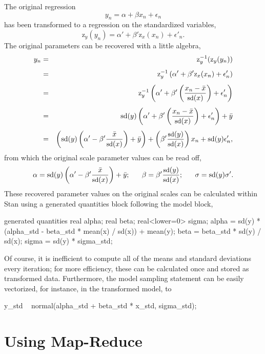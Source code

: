 The original regression
\[
y_n
= \alpha + \beta x_n + \epsilon_n
\]
has been transformed to a regression on the standardized variables,
\[
\mbox{z}_y(y_n)
= \alpha'
+ \beta' \mbox{z}_x(x_n)
+ \epsilon'_n.
\]
The original parameters can be recovered with a little algebra,
%
\begin{eqnarray*}
y_n
& = & \mbox{z}_y^{-1}(\mbox{z}_y(y_n))
\\[4pt]
& = &
\mbox{z}_y^{-1}
\left(
\alpha'
+ \beta' \mbox{z}_x(x_n)
+ \epsilon_n'
\right)
\\[4pt]
& = &
\mbox{z}_y^{-1}
\left(
\alpha'
+ \beta'
    \left(
      \frac{x_n - \bar{x}}{\mbox{\small sd}(x)}
    \right)
+ \epsilon_n'
\right)
\\[4pt]
& = &
\mbox{sd}(y)
\left(
\alpha'
+ \beta'
    \left(
      \frac{x_n - \bar{x}}{\mbox{\small sd}(x)}
    \right)
+ \epsilon_n'
\right)
+ \bar{y}
\\[4pt]
& = &
\left(
  \mbox{sd}(y)
      \left(
          \alpha'
          - \beta' \frac{\bar{x}}{\mbox{\small sd}(x)}
      \right)
  + \bar{y}
\right)
+ \left(
      \beta' \frac{\mbox{\small sd}(y)}{\mbox{\small sd}(x)}
  \right) x_n
+ \mbox{sd}(y) \epsilon'_n,
\end{eqnarray*}
%
from which the original scale parameter values can be read off,
\[
\alpha
=
\mbox{sd}(y)
      \left(
          \alpha'
          - \beta' \frac{\bar{x}}{\mbox{\small sd}(x)}
      \right)
  + \bar{y};
\ \ \ \ \
\beta = \beta' \frac{\mbox{\small sd}(y)}{\mbox{\small sd}(x)};
\ \ \ \ \
\sigma = \mbox{sd}(y) \sigma'.
\]
%
These recovered parameter values on the original scales can be
calculated within Stan using a generated quantities block following
the model block,
\begin{stancode}
generated quantities {
  real alpha;
  real beta;
  real<lower=0> sigma;
  alpha = sd(y) * (alpha_std - beta_std * mean(x) / sd(x))
           + mean(y);
  beta = beta_std * sd(y) / sd(x);
  sigma = sd(y) * sigma_std;
}
\end{stancode}
%
Of course, it is inefficient to compute all of the means and standard
deviations every iteration; for more efficiency, these can be
calculated once and stored as transformed data.  Furthermore, the
model sampling statement can be easily vectorized, for instance, in
the transformed model, to
\begin{stancode}
    y_std ~ normal(alpha_std + beta_std * x_std, sigma_std);
\end{stancode}

\section{Using Map-Reduce}

